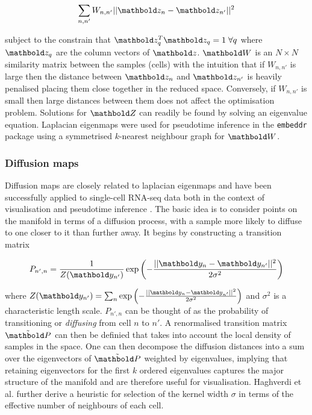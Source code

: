 \begin{equation}
  \sum_{n,n'} W_{n,n'}\lvert \lvert \mbz_n - \mbz_{n'}\rvert \rvert^2
\end{equation}

subject to the constrain that $\mbz_q^T \mbz_q = 1 \; \forall q$ where $\mbz_q$ are the column vectors of $\mbz$.
 $\mbW$ is an $N \times N$ similarity matrix between the samples (cells) with the intuition that if
$W_{n,n'}$ is large then the distance between $\mbz_n$ and $\mbz_{n'}$ is heavily penalised placing them close together in the reduced space. Conversely, if $W_{n,n'}$ is small then large distances between them does not affect the optimisation problem. Solutions for $\mbZ$ can readily be found by solving an eigenvalue equation. %
Laplacian eigenmaps were used for pseudotime inference in the \texttt{embeddr} package \cite{campbell2015laplacian} using a symmetrised $k$-nearest neighbour graph for $\mbW$.


\subsubsection{Diffusion maps} \label{sec:diffusion_maps}

Diffusion maps are closely related to laplacian eigenmaps and have been successfully applied to single-cell RNA-seq data both in the context of visualisation \cite{haghverdi2015diffusion} and pseudotime inference \cite{haghverdi2016diffusion}. The basic idea is to consider points on the manifold in terms of a diffusion process, with a sample more likely to diffuse to one closer to it than further away. It begins by constructing a transition matrix

\begin{equation}
  P_{n',n} = \frac{1}{Z(\mby_{n'})} \exp\left( - \frac{\lvert \lvert \mby_n - \mby_{n'} \rvert \rvert^2}{2 \sigma^2}\right)
\end{equation}

where $Z(\mby_{n'}) = \sum_{n}  \exp\left( - \frac{\lvert \lvert \mby_n - \mby_{n'} \rvert \rvert^2}{2 \sigma^2}\right)$ and $\sigma^2$ is a characteristic length scale. $P_{n',n}$ can be thought of as the probability of transitioning or \emph{diffusing} from cell $n$ to $n'$. A renormalised transition matrix $\tilde{\mbP}$ can then be definied that takes into account the local density of samples in the space. One can then decompose the diffusion distances into a sum over the eigenvectors of $\tilde{\mbP}$
weighted by eigenvalues,
implying that retaining eigenvectors for the first $k$ ordered eigenvalues captures the major structure of the manifold and are therefore useful for visualisation. Haghverdi et al. \cite{haghverdi2015diffusion} further derive a heuristic for selection of the kernel width $\sigma$ in terms of the effective number of neighbours of each cell.

